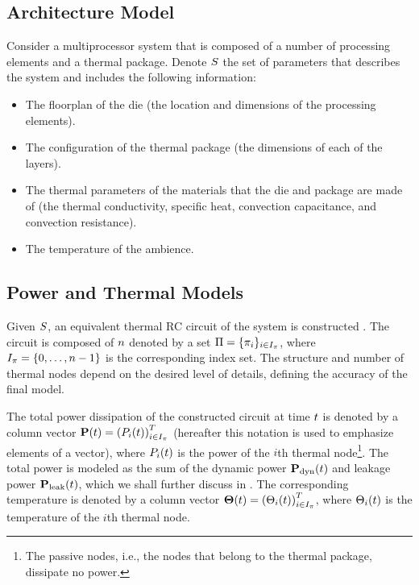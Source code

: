 \subsection{Architecture Model}
Consider a multiprocessor system that is composed of a number of processing elements and a thermal package. Denote $S$ the set of parameters that describes the system and includes the following information:
\begin{itemize}
  \item The floorplan of the die (the location and dimensions of the processing elements).
  \item The configuration of the thermal package (the dimensions of each of the layers).
  \item The thermal parameters of the materials that the die and package are made of (the thermal conductivity, specific heat, convection capacitance, and convection resistance).
  \item The temperature of the ambience.
\end{itemize}

\subsection{Power and Thermal Models}  
Given $S$, an equivalent thermal RC circuit of the system is constructed \cite{kreith2000}. The circuit is composed of $n$  denoted by a set $\Pi = \{ \pi_i \}_{i \in I_\pi}$, where $I_\pi = \{ 0, \dots, n - 1 \}$ is the corresponding index set. The structure and number of thermal nodes depend on the desired level of details, defining the accuracy of the final model.

The total power dissipation of the constructed circuit at time $t$ is denoted by a column vector $\mathbf{P}(t) = \left(P_i(t)\right)^T_{i \in I_\pi}$ (hereafter this notation is used to emphasize elements of a vector), where $P_i(t)$ is the power of the $i$th thermal node\footnote{The passive nodes, i.e., the nodes that belong to the thermal package, dissipate no power.}. The total power is modeled as the sum of the dynamic power $\mathbf{P}_{\text{dyn}}(t)$ and leakage power $\mathbf{P}_{\text{leak}}(t)$, which we shall further discuss in . The corresponding temperature is denoted by a column vector $\mathbf{\Theta}(t) = \left(\Theta_i(t)\right)^T_{i \in I_\pi}$, where $\Theta_i(t)$ is the temperature of the $i$th thermal node.


